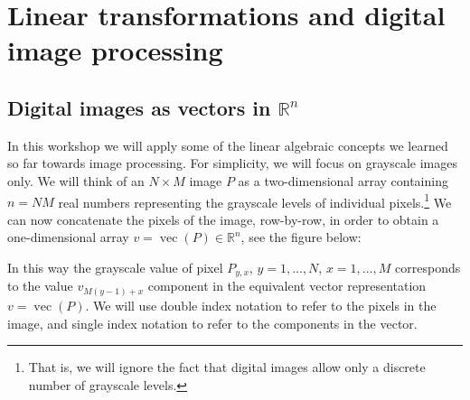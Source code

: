 \documentclass[10pt,a4paper]{article}
\newcommand{\R}{\mathbb{R}}
\theoremstyle{plain}
\theoremstyle{definition}
\DeclareMathOperator{\vc}{vec}
\begin{document}
\section{Linear transformations and digital image processing}

\subsection*{Digital images as vectors in \(\R^n\)}
In this workshop we will apply some of the linear algebraic concepts we learned so far towards image processing.  For simplicity, we will focus on grayscale images only.
We will think of an \(N\times M\) image \(P\) as a two-dimensional array containing \(n = NM\) real numbers representing the grayscale levels of individual pixels.\footnote{That is, we will ignore the
fact that digital images allow only a discrete number of grayscale levels.}
We can now concatenate the pixels of the image, row-by-row, in order to obtain a one-dimensional array \(v=\vc(P) \in \R^n\), see the figure below:
In this way the grayscale value of pixel \(P_{y,x}\), \(y=1,\dots,N\), \(x=1,\dots,M\)
corresponds to the value \(v_{M(y-1) + x}\) component in the equivalent vector representation \(v=\vc(P)\).
We will use double index notation to refer to the pixels in the image, and single index
notation to refer to the components in the vector.
\end{document}
